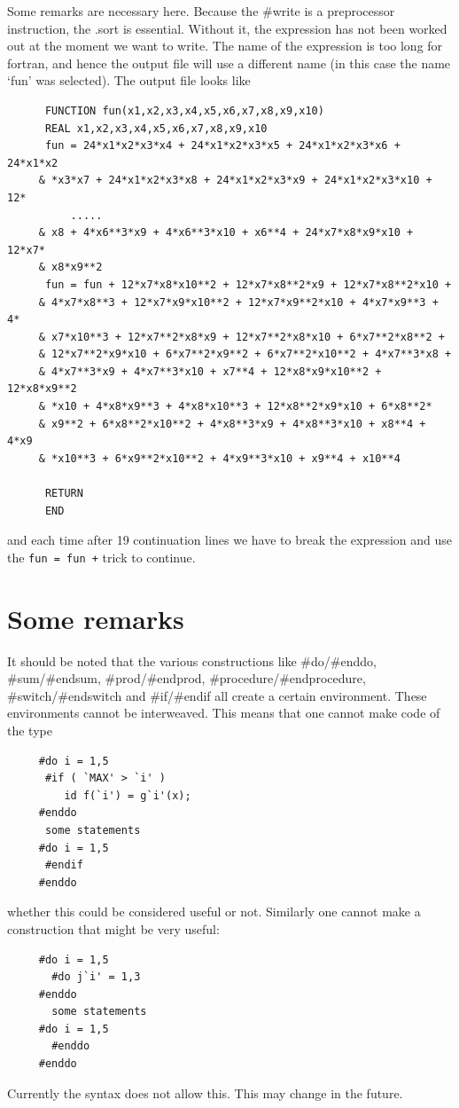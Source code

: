Some remarks are necessary here. Because the \#write is a preprocessor 
instruction, the .sort is essential. Without it, the 
expression has not been worked out at the moment we want to write. The name 
of the expression is too long for fortran, and hence the 
output file will use a different name (in this case the name `fun' was 
selected). The output file looks like
\begin{verbatim}
      FUNCTION fun(x1,x2,x3,x4,x5,x6,x7,x8,x9,x10)
      REAL x1,x2,x3,x4,x5,x6,x7,x8,x9,x10
      fun = 24*x1*x2*x3*x4 + 24*x1*x2*x3*x5 + 24*x1*x2*x3*x6 + 24*x1*x2
     & *x3*x7 + 24*x1*x2*x3*x8 + 24*x1*x2*x3*x9 + 24*x1*x2*x3*x10 + 12*
          .....
     & x8 + 4*x6**3*x9 + 4*x6**3*x10 + x6**4 + 24*x7*x8*x9*x10 + 12*x7*
     & x8*x9**2
      fun = fun + 12*x7*x8*x10**2 + 12*x7*x8**2*x9 + 12*x7*x8**2*x10 + 
     & 4*x7*x8**3 + 12*x7*x9*x10**2 + 12*x7*x9**2*x10 + 4*x7*x9**3 + 4*
     & x7*x10**3 + 12*x7**2*x8*x9 + 12*x7**2*x8*x10 + 6*x7**2*x8**2 + 
     & 12*x7**2*x9*x10 + 6*x7**2*x9**2 + 6*x7**2*x10**2 + 4*x7**3*x8 + 
     & 4*x7**3*x9 + 4*x7**3*x10 + x7**4 + 12*x8*x9*x10**2 + 12*x8*x9**2
     & *x10 + 4*x8*x9**3 + 4*x8*x10**3 + 12*x8**2*x9*x10 + 6*x8**2*
     & x9**2 + 6*x8**2*x10**2 + 4*x8**3*x9 + 4*x8**3*x10 + x8**4 + 4*x9
     & *x10**3 + 6*x9**2*x10**2 + 4*x9**3*x10 + x9**4 + x10**4

      RETURN
      END
\end{verbatim}
and each time after 19 continuation lines we have to break the expression 
and use the \verb:fun = fun +: trick to continue.


\section{Some remarks}
It should be noted that the various constructions like 
\#do/\#enddo, 
\#sum/\#endsum, 
\#prod/\#endprod, 
\#procedure/\#endprocedure, 
\#switch/\#endswitch and 
\#if/\#endif all 
create a certain environment. These environments cannot be interweaved. This 
means that one cannot make code of the type
\begin{verbatim}
     #do i = 1,5
      #if ( `MAX' > `i' )
         id f(`i') = g`i'(x);
     #enddo
      some statements
     #do i = 1,5
      #endif
     #enddo
\end{verbatim}
whether this could be considered useful or not. Similarly one cannot make a 
construction that might be very useful:
\begin{verbatim}
     #do i = 1,5
       #do j`i' = 1,3
     #enddo
       some statements
     #do i = 1,5
       #enddo
     #enddo
\end{verbatim}
Currently the syntax does not allow this. This may change in the future.



